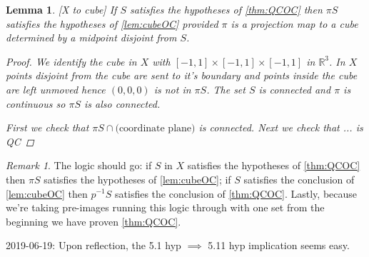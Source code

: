 \documentclass{article}
\theoremstyle{mystyle}
\newtheorem{lem}{Lemma}[section]
\theoremstyle{remark}
\newtheorem{rmk}{Remark}[section]
\begin{document}
\begin{lem}
	\label{lem:Xtocube}
	[X to cube]
	If \(S\) satisfies the hypotheses of \ref{thm:QCOC} then \(\pi S\) satisfies the hypotheses of \ref{lem:cubeOC} provided \(\pi\) is a projection map to a cube determined by a midpoint disjoint from \(S\).
\begin{proof}
	We identify the cube in \(X\) with \([-1,1] \times [-1,1] \times [-1,1]\)  in \(\mathbb{R}^{3}\). In \(X\) points disjoint from the cube are sent to it's boundary and points inside the cube are left unmoved hence \((0,0,0)\) is not in \(\pi S\). The set \(S\) is connected and \(\pi\) is continuous so \(\pi S\) is also connected.  

	First we check that \(\pi S \cap \text{(coordinate plane)}\) is connected. 	
	Next we check that ... is QC
			
\end{proof}
	


\end{lem}

\begin{rmk}
The logic should go: if \(S\) in \(X\) satisfies the hypotheses of \ref{thm:QCOC} then \(\pi S\) satisfies the hypotheses of \ref{lem:cubeOC}; if \(S\) satisfies the conclusion of \ref{lem:cubeOC} then \(p^{-1} S\) satisfies the conclusion of \ref{thm:QCOC}. Lastly, because we're taking pre-images running this logic through with one set from the beginning we have proven \ref{thm:QCOC}.
\end{rmk}

2019-06-19: Upon reflection, the 5.1 hyp \(\implies \) 5.11 hyp implication seems easy. 
\end{document}
